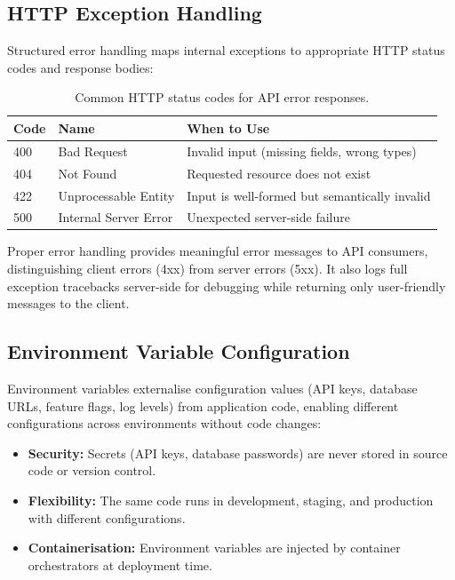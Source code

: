 \documentclass[10pt,a4paper]{article}
\begin{document}
\subsection{HTTP Exception Handling}
\label{sec:http-exceptions}

Structured error handling maps internal exceptions to appropriate HTTP status codes and response bodies:

\begin{table}[H]
\centering
\caption{Common HTTP status codes for API error responses.}
\label{tab:http-errors}
\begin{tabular}{llp{7cm}}
\toprule
\textbf{Code} & \textbf{Name} & \textbf{When to Use} \\
\midrule
400 & Bad Request & Invalid input (missing fields, wrong types) \\
404 & Not Found & Requested resource does not exist \\
422 & Unprocessable Entity & Input is well-formed but semantically invalid \\
500 & Internal Server Error & Unexpected server-side failure \\
\bottomrule
\end{tabular}
\end{table}

Proper error handling provides meaningful error messages to API consumers, distinguishing client errors (4xx) from server errors (5xx). It also logs full exception tracebacks server-side for debugging while returning only user-friendly messages to the client.

\subsection{Environment Variable Configuration}
\label{sec:env-vars}

Environment variables externalise configuration values (API keys, database URLs, feature flags, log levels) from application code, enabling different configurations across environments without code changes:

\begin{itemize}
    \item \textbf{Security:} Secrets (API keys, database passwords) are never stored in source code or version control.
    \item \textbf{Flexibility:} The same code runs in development, staging, and production with different configurations.
    \item \textbf{Containerisation:} Environment variables are injected by container orchestrators at deployment time.
\end{itemize}
\end{document}
